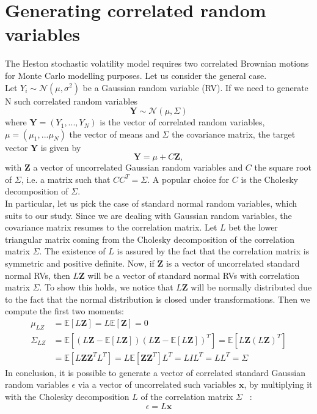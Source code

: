 \documentclass[12pt]{article}
\numberwithin{equation}{section}
\begin{document}
\section{Generating correlated random variables}
The Heston stochastic volatility model requires two correlated Brownian motions for Monte Carlo modelling purposes. Let us consider the general case.\\
\newline
Let $Y_i \sim \mathcal{N}(\mu,\sigma^2)$ be a Gaussian random variable (RV). If we need to generate N such correlated random variables
\begin{equation*}
\textbf{Y} \sim \mathcal{N} (\mu, \Sigma)
\end{equation*}  
where $\textbf{Y}=(Y_1,...,Y_N)$ is the vector of correlated random variables, $\mu = (\mu_1,...\mu_N)$ the vector of means and $\Sigma$ the covariance matrix, the target vector $\textbf{Y}$ is given by
\begin{equation*}
\textbf{Y} = \mu + C\textbf{Z},
\end{equation*} 
with $\textbf{Z}$ a vector of uncorrelated Gaussian random variables and $C$ the square root of $\Sigma$, i.e. a matrix such that $CC^T=\Sigma$. A popular choice for $C$ is the Cholesky decomposition of $\Sigma$.\\
\newline
In particular, let us pick the case of standard normal random variables, which suits to our study. Since we are dealing with Gaussian random variables, the covariance matrix resumes to the correlation matrix. Let $L$ bet the lower triangular matrix coming from the Cholesky decomposition of the correlation matrix $\Sigma$. The existence of $L$ is assured by the fact that the correlation matrix is symmetric and positive definite. Now, if $\textbf{Z}$ is a vector of uncorrelated standard normal RVs, then $L\textbf{Z}$ will be a vector of standard normal RVs with correlation matrix $\Sigma$. To show this holds, we notice that $L\textbf{Z}$ will be normally distributed due to the fact that the normal distribution is closed under transformations. Then we compute the   first two moments:
\begin{align*}
\mu_{LZ} 	&= \mathbb{E}[L\textbf{Z}] = L\mathbb{E}[\textbf{Z}] = 0 \\
\Sigma_{LZ} 	&= \mathbb{E}[ (L\textbf{Z} - \mathbb{E}[L\textbf{Z}]) (L\textbf{Z} - \mathbb{E}[L\textbf{Z}])^T ] = \mathbb{E}[L\textbf{Z}(L\textbf{Z})^T] \\
&= \mathbb{E}[L\textbf{Z}\textbf{Z}^TL^T] = L \mathbb{E}[\textbf{ZZ}^T] L^T = LIL^T = LL^T = \Sigma 
\end{align*}
In conclusion, it is possible to generate a vector of correlated standard Gaussian random variables \textbf{$\epsilon$} via a vector of uncorrelated such variables $\textbf{x}$, by multiplying it with the Cholesky decomposition $L$ of the correlation matrix $\Sigma$ \ :
\begin{equation*}
\epsilon = L \textbf{x}
\end{equation*}
\end{document}
